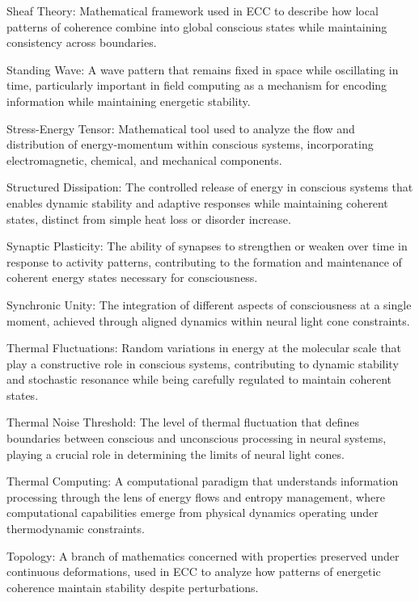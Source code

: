 Sheaf Theory: Mathematical framework used in ECC to describe how local patterns of coherence combine into global conscious states while maintaining consistency across boundaries.

Standing Wave: A wave pattern that remains fixed in space while oscillating in time, particularly important in field computing as a mechanism for encoding information while maintaining energetic stability.

Stress-Energy Tensor: Mathematical tool used to analyze the flow and distribution of energy-momentum within conscious systems, incorporating electromagnetic, chemical, and mechanical components.

Structured Dissipation: The controlled release of energy in conscious systems that enables dynamic stability and adaptive responses while maintaining coherent states, distinct from simple heat loss or disorder increase.

Synaptic Plasticity: The ability of synapses to strengthen or weaken over time in response to activity patterns, contributing to the formation and maintenance of coherent energy states necessary for consciousness.

Synchronic Unity: The integration of different aspects of consciousness at a single moment, achieved through aligned dynamics within neural light cone constraints.

Thermal Fluctuations: Random variations in energy at the molecular scale that play a constructive role in conscious systems, contributing to dynamic stability and stochastic resonance while being carefully regulated to maintain coherent states.

Thermal Noise Threshold: The level of thermal fluctuation that defines boundaries between conscious and unconscious processing in neural systems, playing a crucial role in determining the limits of neural light cones.

Thermal Computing: A computational paradigm that understands information processing through the lens of energy flows and entropy management, where computational capabilities emerge from physical dynamics operating under thermodynamic constraints.

Topology: A branch of mathematics concerned with properties preserved under continuous deformations, used in ECC to analyze how patterns of energetic coherence maintain stability despite perturbations.

